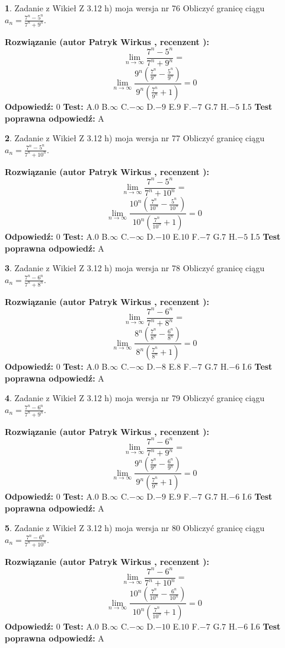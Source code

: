\documentclass[12pt, a4paper]{article}
\theoremstyle{definition} %
\newtheorem{zad}{}
\newcommand{\zadStart}[1]{\begin{zad}#1\newline}
\newcommand{\zadStop}{\end{zad}}
\newcommand{\rozwStart}[2]{\noindent \textbf{Rozwiązanie (autor #1 , recenzent #2): }\newline}
\newcommand{\rozwStop}{\newline}
\newcommand{\odpStart}{\noindent \textbf{Odpowiedź:}\newline}
\newcommand{\odpStop}{\newline}
\newcommand{\testStart}{\noindent \textbf{Test:}\newline}
\newcommand{\testStop}{\newline}
\newcommand{\kluczStart}{\noindent \textbf{Test poprawna odpowiedź:}\newline}
\newcommand{\kluczStop}{\newline}
\begin{document}
\zadStart{Zadanie z Wikieł Z 3.12 h) moja wersja nr 76}
Obliczyć granicę ciągu $a_{n}=\frac{7^{n} - 5^{n}}{7^{n} + 9^{n}}$.
\zadStop
\rozwStart{Patryk Wirkus}{}
$$\lim\limits_{n\to\infty}\frac{7^{n} - 5^{n}}{7^{n} + 9^{n}}=$$
$$\lim\limits_{n\to\infty}\frac{9^{n}(\frac{7^{n}}{9^{n}} - \frac{5^{n}}{9^{n}})}{9^{n}(\frac{7^{n}}{9^{n}} + 1)} = 0$$
\rozwStop
\odpStart
$0$
\odpStop
\testStart
A.$0$
B.$\infty$
C.$-\infty$
D.$-9$
E.$9$
F.$-7$
G.$7$
H.$-5$
I.$5$
\testStop
\kluczStart
A
\kluczStop



\zadStart{Zadanie z Wikieł Z 3.12 h) moja wersja nr 77}
Obliczyć granicę ciągu $a_{n}=\frac{7^{n} - 5^{n}}{7^{n} + 10^{n}}$.
\zadStop
\rozwStart{Patryk Wirkus}{}
$$\lim\limits_{n\to\infty}\frac{7^{n} - 5^{n}}{7^{n} + 10^{n}}=$$
$$\lim\limits_{n\to\infty}\frac{10^{n}(\frac{7^{n}}{10^{n}} - \frac{5^{n}}{10^{n}})}{10^{n}(\frac{7^{n}}{10^{n}} + 1)} = 0$$
\rozwStop
\odpStart
$0$
\odpStop
\testStart
A.$0$
B.$\infty$
C.$-\infty$
D.$-10$
E.$10$
F.$-7$
G.$7$
H.$-5$
I.$5$
\testStop
\kluczStart
A
\kluczStop



\zadStart{Zadanie z Wikieł Z 3.12 h) moja wersja nr 78}
Obliczyć granicę ciągu $a_{n}=\frac{7^{n} - 6^{n}}{7^{n} + 8^{n}}$.
\zadStop
\rozwStart{Patryk Wirkus}{}
$$\lim\limits_{n\to\infty}\frac{7^{n} - 6^{n}}{7^{n} + 8^{n}}=$$
$$\lim\limits_{n\to\infty}\frac{8^{n}(\frac{7^{n}}{8^{n}} - \frac{6^{n}}{8^{n}})}{8^{n}(\frac{7^{n}}{8^{n}} + 1)} = 0$$
\rozwStop
\odpStart
$0$
\odpStop
\testStart
A.$0$
B.$\infty$
C.$-\infty$
D.$-8$
E.$8$
F.$-7$
G.$7$
H.$-6$
I.$6$
\testStop
\kluczStart
A
\kluczStop



\zadStart{Zadanie z Wikieł Z 3.12 h) moja wersja nr 79}
Obliczyć granicę ciągu $a_{n}=\frac{7^{n} - 6^{n}}{7^{n} + 9^{n}}$.
\zadStop
\rozwStart{Patryk Wirkus}{}
$$\lim\limits_{n\to\infty}\frac{7^{n} - 6^{n}}{7^{n} + 9^{n}}=$$
$$\lim\limits_{n\to\infty}\frac{9^{n}(\frac{7^{n}}{9^{n}} - \frac{6^{n}}{9^{n}})}{9^{n}(\frac{7^{n}}{9^{n}} + 1)} = 0$$
\rozwStop
\odpStart
$0$
\odpStop
\testStart
A.$0$
B.$\infty$
C.$-\infty$
D.$-9$
E.$9$
F.$-7$
G.$7$
H.$-6$
I.$6$
\testStop
\kluczStart
A
\kluczStop



\zadStart{Zadanie z Wikieł Z 3.12 h) moja wersja nr 80}
Obliczyć granicę ciągu $a_{n}=\frac{7^{n} - 6^{n}}{7^{n} + 10^{n}}$.
\zadStop
\rozwStart{Patryk Wirkus}{}
$$\lim\limits_{n\to\infty}\frac{7^{n} - 6^{n}}{7^{n} + 10^{n}}=$$
$$\lim\limits_{n\to\infty}\frac{10^{n}(\frac{7^{n}}{10^{n}} - \frac{6^{n}}{10^{n}})}{10^{n}(\frac{7^{n}}{10^{n}} + 1)} = 0$$
\rozwStop
\odpStart
$0$
\odpStop
\testStart
A.$0$
B.$\infty$
C.$-\infty$
D.$-10$
E.$10$
F.$-7$
G.$7$
H.$-6$
I.$6$
\testStop
\kluczStart
A
\kluczStop
\end{document}
